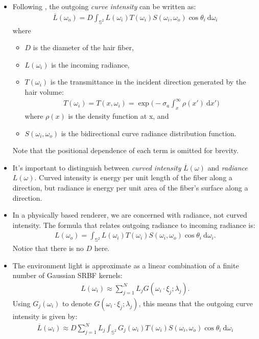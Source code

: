 \documentclass[10pt]{article}
\newcommand{\dee}{\mathrm{d}}
\begin{document}
  \begin{itemize}
    \item Following \cite{Marschner:2003}, the outgoing \emph{curve intensity} can be written as:
    \begin{align*}
      \overline{L}(\omega_o) = D \int_{\mathbb{S}^2} L(\omega_i) T(\omega_i) S(\omega_i, \omega_o) \cos \theta_i\ \dee\omega_i
    \end{align*}    
    where 
    \begin{itemize}
      \item $D$ is the diameter of the hair fiber,
      \item $L(\omega_i)$ is the incoming radiance,
      \item $T(\omega_i)$ is the transmittance in the incident direction generated by the hair volume:
      \begin{align*}
        T(\omega_i) = T(x,\omega_i) = \exp\bigg( -\sigma_a \int_x^\infty \rho(x')\ \dee x' \bigg)
      \end{align*}
      where $\rho(x)$ is the density function at x, and
      \item $S(\omega_i, \omega_o)$ is the bidirectional curve radiance distribution function.
    \end{itemize}
    Note that the positional dependence of each term is omitted for brevity.    
    
    \item It's important to distinguish between \emph{curved intensity} $\overline{L}(\omega)$ and \emph{radiance} $L(\omega)$. Curved intensity is energy per unit length of the fiber along a direction, but radiance is energy per unit area of the fiber's surface along a direction. 
    
    \item In a physically based renderer, we are concerned with radiance, not curved intensity. The formula that relates outgoing radiance to incoming radiance is:
    \begin{align*}
      L(\omega_o) = \int_{\mathbb{S}^2} L(\omega_i) T(\omega_i) S(\omega_i, \omega_o) \cos \theta_i\ \dee\omega_i.
    \end{align*}    
    Notice that there is no $D$ here.
    
    \item The environment light is approximate as a linear combination of a finite number of Gaussian SRBF kernels:
    \begin{align*}
      L(\omega_i) \approx \sum_{j=1}^N L_j G(\omega_i \cdot \xi_j; \lambda_j).
    \end{align*}    
    Using $G_j(\omega_i)$ to denote $G(\omega_i \cdot \xi_j; \lambda_j)$, this means that the outgoing curve intensity is given by:
    \begin{align*}
      \overline{L}(\omega_i) \approx D \sum_{j=1}^N L_j \int_{\mathbb{S}^2} G_j(\omega_i) T(\omega_i) S(\omega_i, \omega_o) \cos \theta_i\ \dee\omega_i
    \end{align*}
    

\end{itemize}
\end{document}
